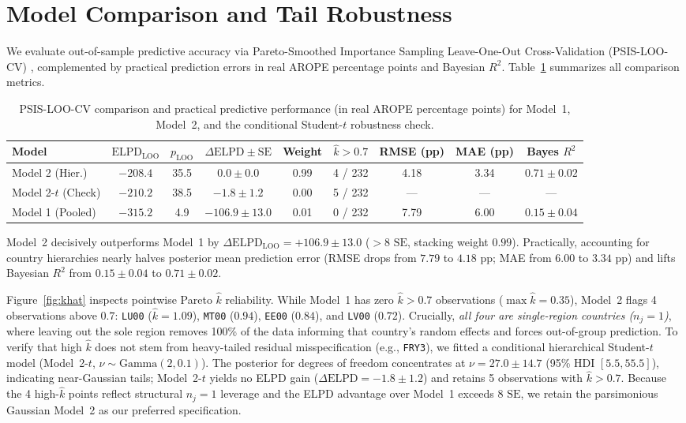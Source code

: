 \documentclass[11pt,a4paper]{article}
\begin{document}
\section{Model Comparison and Tail Robustness}

We evaluate out-of-sample predictive accuracy via Pareto-Smoothed Importance Sampling Leave-One-Out Cross-Validation (PSIS-LOO-CV) \cite{vehtari2017practical}, complemented by practical prediction errors in real AROPE percentage points and Bayesian $R^2$. Table~\ref{tab:comparison} summarizes all comparison metrics.

\begin{table}[H]
\centering
\caption{PSIS-LOO-CV comparison and practical predictive performance (in real AROPE percentage points) for Model~1, Model~2, and the conditional Student-$t$ robustness check.}
\label{tab:comparison}
\begin{tabular}{lcccccccc}
\toprule
Model & $\text{ELPD}_{\text{LOO}}$ & $p_{\text{LOO}}$ & $\Delta\text{ELPD} \pm \text{SE}$ & Weight & $\hat{k} > 0.7$ & RMSE (pp) & MAE (pp) & Bayes $R^2$ \\
\midrule
Model 2 (Hier.) & $-208.4$ & 35.5 & $0.0 \pm 0.0$ & 0.99 & 4 / 232 & 4.18 & 3.34 & $0.71 \pm 0.02$ \\
Model 2-$t$ (Check) & $-210.2$ & 38.5 & $-1.8 \pm 1.2$ & 0.00 & 5 / 232 & --- & --- & --- \\
Model 1 (Pooled) & $-315.2$ & 4.9 & $-106.9 \pm 13.0$ & 0.01 & 0 / 232 & 7.79 & 6.00 & $0.15 \pm 0.04$ \\
\bottomrule
\end{tabular}
\end{table}

Model~2 decisively outperforms Model~1 by $\Delta\text{ELPD}_{\text{LOO}} = +106.9 \pm 13.0$ ($> 8\text{ SE}$, stacking weight $0.99$). Practically, accounting for country hierarchies nearly halves posterior mean prediction error (RMSE drops from $7.79$ to $4.18\text{ pp}$; MAE from $6.00$ to $3.34\text{ pp}$) and lifts Bayesian $R^2$ from $0.15 \pm 0.04$ to $0.71 \pm 0.02$.

Figure~\ref{fig:khat} inspects pointwise Pareto $\hat{k}$ reliability. While Model~1 has zero $\hat{k} > 0.7$ observations ($\max \hat{k} = 0.35$), Model~2 flags 4 observations above $0.7$: \texttt{LU00} ($\hat{k} = 1.09$), \texttt{MT00} ($0.94$), \texttt{EE00} ($0.84$), and \texttt{LV00} ($0.72$). Crucially, \emph{all four are single-region countries ($n_j = 1$)}, where leaving out the sole region removes 100\% of the data informing that country's random effects and forces out-of-group prediction. To verify that high $\hat{k}$ does not stem from heavy-tailed residual misspecification (e.g., \texttt{FRY3}), we fitted a conditional hierarchical Student-$t$ model (Model~2-$t$, $\nu \sim \text{Gamma}(2, 0.1)$). The posterior for degrees of freedom concentrates at $\nu = 27.0 \pm 14.7$ (95\% HDI $[5.5, 55.5]$), indicating near-Gaussian tails; Model~2-$t$ yields no ELPD gain ($\Delta\text{ELPD} = -1.8 \pm 1.2$) and retains 5 observations with $\hat{k} > 0.7$. Because the 4 high-$\hat{k}$ points reflect structural $n_j = 1$ leverage and the ELPD advantage over Model~1 exceeds $8\text{ SE}$, we retain the parsimonious Gaussian Model~2 as our preferred specification.
\end{document}
